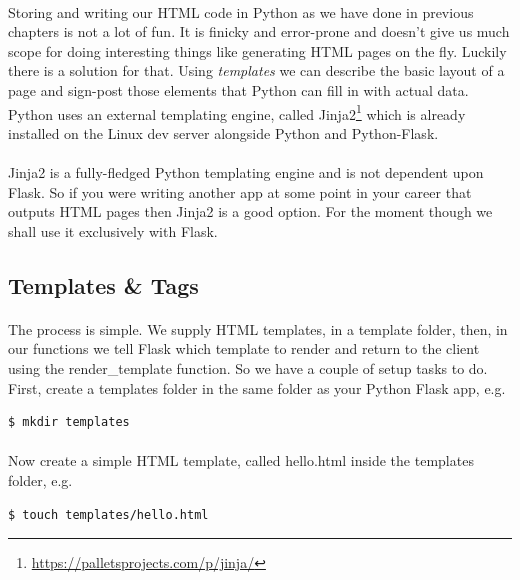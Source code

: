 \documentclass[12pt, a4paper, oneside]{book}
\begin{document}
\paragraph{} Storing and writing our HTML code in Python as we have done in previous chapters is not a lot of fun. It is finicky and error-prone and doesn't give us much scope for doing interesting things like generating HTML pages on the fly. Luckily there is a solution for that. Using \emph{templates} we can describe the basic layout of a page and sign-post those elements that Python can fill in with actual data. Python uses an external templating engine, called Jinja2\footnote{\url{https://palletsprojects.com/p/jinja/}} which is already installed on the Linux dev server alongside Python and Python-Flask.

\paragraph{} Jinja2 is a fully-fledged Python templating engine and is not dependent upon Flask. So if you were writing another app at some point in your career that outputs HTML pages then Jinja2 is a good option. For the moment though we shall use it exclusively with Flask.


\subsection{Templates \& Tags}
\label{templates-tags}
\paragraph{} The process is simple. We supply HTML templates, in a template folder, then, in our functions we tell Flask which template to render and return to the client using the render\_template function. So we have a couple of setup tasks to do. First, create a templates folder in the same folder as your Python Flask app, e.g.

\begin{lstlisting}[style=DOS]
$ mkdir templates
\end{lstlisting}

\paragraph{} Now create a simple HTML template, called hello.html inside the templates folder, e.g.
\begin{lstlisting}[style=DOS]
$ touch templates/hello.html
\end{lstlisting}
\end{document}
